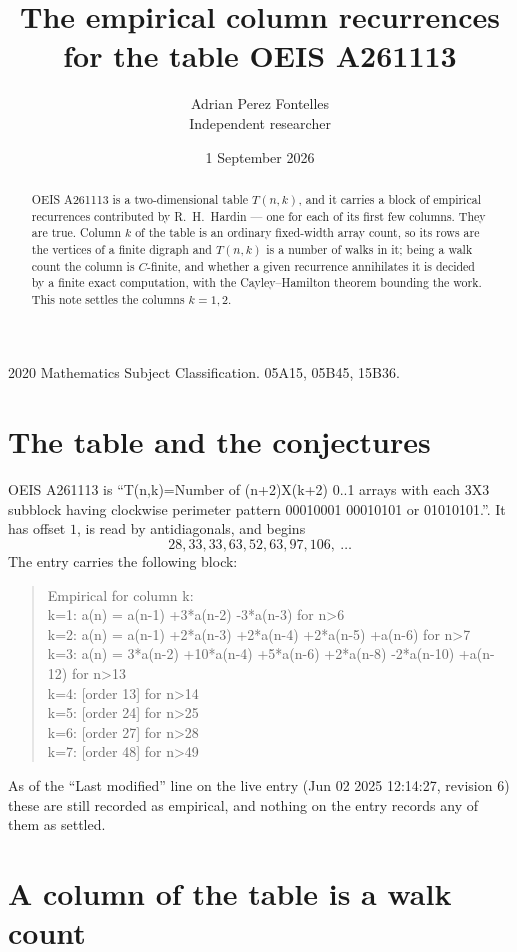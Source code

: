 \documentclass[11pt,a4paper]{article}
\title{The empirical column recurrences for the table OEIS A261113}
\author{Adrian Perez Fontelles\\ \small Independent researcher}
\date{1 September 2026}
\theoremstyle{plain}
\theoremstyle{definition}
\begin{document}
\maketitle

\begin{abstract}
OEIS A261113 is a two-dimensional table $T(n,k)$, and it carries a block of empirical
recurrences contributed by R.~H.~Hardin --- one for each of its first few columns. They are
true. Column $k$ of the table is an ordinary fixed-width array count, so its rows are the
vertices of a finite digraph and $T(n,k)$ is a number of walks in it; being a walk count the
column is $C$-finite, and whether a given recurrence annihilates it is decided by a finite
exact computation, with the Cayley--Hamilton theorem bounding the work. This note settles the columns $k=1, 2$.
\end{abstract}

\noindent\small 2020 Mathematics Subject Classification. 05A15, 05B45, 15B36.\normalsize

\section{The table and the conjectures}

OEIS A261113 is ``T(n,k)=Number of (n+2)X(k+2) 0..1 arrays with each 3X3 subblock having clockwise perimeter pattern 00010001 00010101 or 01010101.''. It has offset $1$, is
read by antidiagonals, and begins
\[
28, 33, 33, 63, 52, 63, 97, 106,\ \dots
\]
The entry carries the following block:
\begin{quote}\small
Empirical for column k:\\
k=1: a(n) = a(n-1) +3*a(n-2) -3*a(n-3) for n>6\\
k=2: a(n) = a(n-1) +2*a(n-3) +2*a(n-4) +2*a(n-5) +a(n-6) for n>7\\
k=3: a(n) = 3*a(n-2) +10*a(n-4) +5*a(n-6) +2*a(n-8) -2*a(n-10) +a(n-12) for n>13\\
k=4: [order 13] for n>14\\
k=5: [order 24] for n>25\\
k=6: [order 27] for n>28\\
k=7: [order 48] for n>49\\
\end{quote}
As of the ``Last modified'' line on the live entry (Jun 02 2025 12:14:27, revision 6) these are still
recorded as empirical, and nothing on the entry records any of them as settled.

\section{A column of the table is a walk count}
\end{document}
